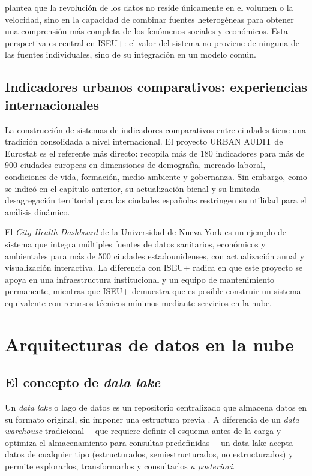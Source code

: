 \textcite{Kitchin2014DataRevolution} plantea que la revolución de los datos no reside únicamente en el volumen o la velocidad, sino en la capacidad de combinar fuentes heterogéneas para obtener una comprensión más completa de los fenómenos sociales y económicos. Esta perspectiva es central en ISEU+: el valor del sistema no proviene de ninguna de las fuentes individuales, sino de su integración en un modelo común.

\subsection{Indicadores urbanos comparativos: experiencias internacionales}

La construcción de sistemas de indicadores comparativos entre ciudades tiene una tradición consolidada a nivel internacional. El proyecto URBAN AUDIT de Eurostat \parencite{Eurostat2023UrbanAudit} es el referente más directo: recopila más de 180 indicadores para más de 900 ciudades europeas en dimensiones de demografía, mercado laboral, condiciones de vida, formación, medio ambiente y gobernanza. Sin embargo, como se indicó en el capítulo anterior, su actualización bienal y su limitada desagregación territorial para las ciudades españolas restringen su utilidad para el análisis dinámico.

El \textit{City Health Dashboard} de la Universidad de Nueva York \parencite{Pinheiro2019CityHealth} es un ejemplo de sistema que integra múltiples fuentes de datos sanitarios, económicos y ambientales para más de 500 ciudades estadounidenses, con actualización anual y visualización interactiva. La diferencia con ISEU+ radica en que este proyecto se apoya en una infraestructura institucional y un equipo de mantenimiento permanente, mientras que ISEU+ demuestra que es posible construir un sistema equivalente con recursos técnicos mínimos mediante servicios en la nube.

\section{Arquitecturas de datos en la nube}

\subsection{El concepto de \textit{data lake}}

Un \textit{data lake} o lago de datos es un repositorio centralizado que almacena datos en su formato original, sin imponer una estructura previa \parencite{Dixon2010DataLake}. A diferencia de un \textit{data warehouse} tradicional —que requiere definir el esquema antes de la carga y optimiza el almacenamiento para consultas predefinidas— un data lake acepta datos de cualquier tipo (estructurados, semiestructurados, no estructurados) y permite explorarlos, transformarlos y consultarlos \textit{a posteriori}.

